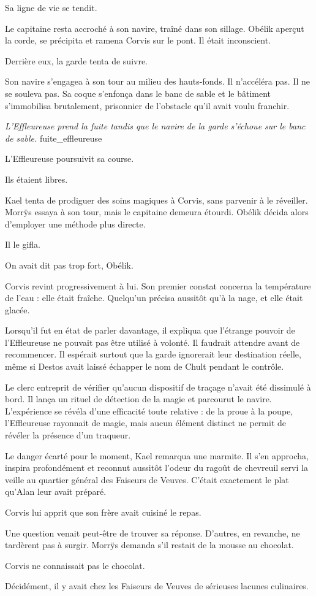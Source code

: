 Sa ligne de vie se tendit.

Le capitaine resta accroché à son navire, traîné dans son sillage. Obélik aperçut la corde, se précipita et ramena Corvis sur le pont. Il était inconscient.

Derrière eux, la garde tenta de suivre.

Son navire s'engagea à son tour au milieu des hauts-fonds. Il n'accéléra pas. Il ne se souleva pas. Sa coque s'enfonça dans le banc de sable et le bâtiment s'immobilisa brutalement, prisonnier de l'obstacle qu'il avait voulu franchir.

{\textit{L'Effleureuse prend la fuite tandis que le navire de la garde s'échoue sur le banc de sable.}}
{fuite_effleureuse}

L'Effleureuse poursuivit sa course.

Ils étaient libres.

\scenebreak

Kael tenta de prodiguer des soins magiques à Corvis, sans parvenir à le réveiller. Morrÿs essaya à son tour, mais le capitaine demeura étourdi. Obélik décida alors d'employer une méthode plus directe.

Il le gifla.

\begin{narrateur}
On avait dit pas trop fort, Obélik.
\end{narrateur}

Corvis revint progressivement à lui. Son premier constat concerna la température de l'eau : elle était fraîche. Quelqu'un précisa aussitôt qu'à la nage, et elle était glacée.

Lorsqu'il fut en état de parler davantage, il expliqua que l'étrange pouvoir de l'Effleureuse ne pouvait pas être utilisé à volonté. Il faudrait attendre avant de recommencer. Il espérait surtout que la garde ignorerait leur destination réelle, même si Destos avait laissé échapper le nom de Chult pendant le contrôle.

Le clerc entreprit de vérifier qu'aucun dispositif de traçage n'avait été dissimulé à bord. Il lança un rituel de détection de la magie et parcourut le navire. L'expérience se révéla d'une efficacité toute relative : de la proue à la poupe, l'Effleureuse rayonnait de magie, mais aucun élément distinct ne permit de révéler la présence d'un traqueur.

Le danger écarté pour le moment, Kael remarqua une marmite. Il s'en approcha, inspira profondément et reconnut aussitôt l'odeur du ragoût de chevreuil servi la veille au quartier général des Faiseurs de Veuves. C'était exactement le plat qu'Alan leur avait préparé.

Corvis lui apprit que son frère avait cuisiné le repas.

Une question venait peut-être de trouver sa réponse. D'autres, en revanche, ne tardèrent pas à surgir. Morrÿs demanda s'il restait de la mousse au chocolat.

Corvis ne connaissait pas le chocolat.

Décidément, il y avait chez les Faiseurs de Veuves de sérieuses lacunes culinaires.
